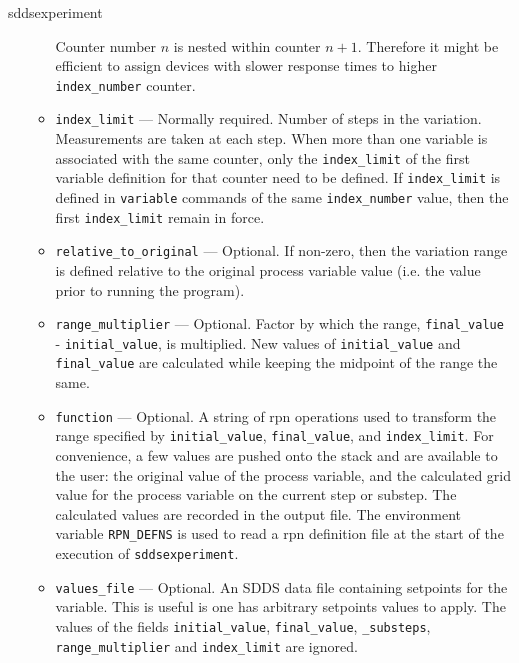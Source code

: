 \begin{sddsprog}{sddsexperiment}
\begin{itemize}
\begin{itemize}
                Counter number $n$ is nested within counter $n+1$. Therefore it might be efficient
                to assign devices with slower response times to
                higher \verb+index_number+ counter.
    \item {\verb+index_limit+} --- Normally required.
                Number of steps in the variation. Measurements are taken at each step.
                When more than one variable is associated with the same counter, only the {\verb+index_limit+}
                of the first variable definition for that counter need to be defined.
                If {\verb+index_limit+} is defined in {\verb+variable+} commands
                of the same  {\verb+index_number+} value, then the first {\verb+index_limit+}
                remain in force.
    \item {\verb+relative_to_original+} --- Optional. If non-zero, then the variation range is defined
                relative to the original process variable value (i.e. the value prior to running the program).
    \item {\verb+range_multiplier+} --- Optional. Factor by which the range, {\verb+final_value+} - {\verb+initial_value+}, is multiplied.
                New values of {\verb+initial_value+} and {\verb+final_value+} are calculated while keeping the midpoint of
                the range the same.
    \item {\verb+function+} --- Optional. A string of rpn operations used to transform the range specified
                by {\verb+initial_value+}, {\verb+final_value+}, and {\verb+index_limit+}.
                For convenience, a few values are pushed onto the stack and are available
                to the user: the original value of the process variable, and the
                calculated grid value for the process variable on the current step or substep.
                The calculated values are
                recorded in the output file. The environment variable \verb+RPN_DEFNS+
                is used to read a rpn definition file at the start of the execution of \verb+sddsexperiment+.
    \item {\verb+values_file+} --- Optional. An SDDS data file containing setpoints for the variable.
                This is useful is one has arbitrary setpoints values to apply.
                The values of the fields {\verb+initial_value+}, {\verb+final_value+}, {\verb+_substeps+},
                {\verb+range_multiplier+} and {\verb+index_limit+} are ignored.


\end{itemize}
\end{itemize}
\end{sddsprog}
